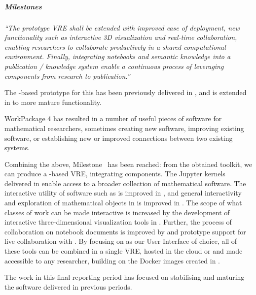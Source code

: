 \subparagraph{Milestones}

\subparagraph{}

\emph{“The prototype VRE shall be extended with improved ease of deployment, new
  functionality such as interactive 3D visualization and real-time
  collaboration, enabling researchers to collaborate productively in a shared
  computational environment. Finally, integrating notebooks and semantic
  knowledge into a publication / knowledge system enable a continuous process
  of leveraging \ODK components from research to publication.”}


The \Jupyter-based prototype for this has been previously delivered in ,
and is extended in  to more mature functionality.

WorkPackage 4 has resulted in a number of useful pieces of software
for mathematical researchers,
sometimes creating new software,
improving existing software,
or establishing new or improved connections between two existing systems.

Combining the above, Milestone~ has
been reached:
from the obtained toolkit, we can produce a \Jupyter-based VRE,
integrating \ODK components.
The Jupyter kernels delivered in 
enable access to a broader collection of mathematical software.
The interactive utility of software such as \Pari is improved in ,
and general interactivity and exploration of mathematical objects in \Sage is improved in .
The scope of what classes of work can be made interactive is increased
by the development of interactive three-dimensional visualization tools in .
Further, the process of collaboration on notebook documents is improved by 
and prototype support for live collaboration with .
By focusing on \Jupyter as our User Interface of choice,
all of these tools can be combined in a single VRE,
hosted in the cloud or and made accessible to any researcher,
building on the Docker images created in .

The work in this final reporting period has focused on stabilising and maturing the software delivered in previous periods.

